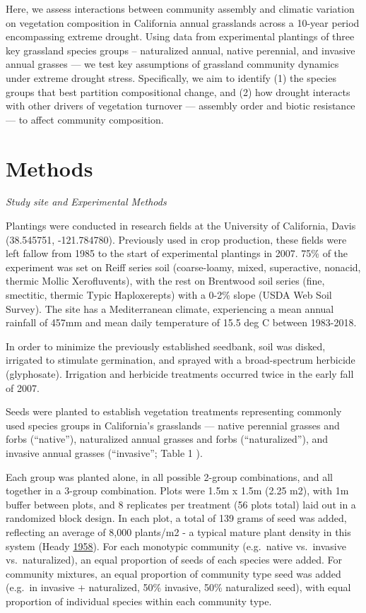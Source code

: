\documentclass[twoside,12pt,final]{ucthesis-CA2012}
\begin{document}
\begin{ucmainmatter}
Here, we assess interactions between community assembly and climatic variation on vegetation composition in California annual grasslands across a 10-year period encompassing extreme drought.
Using data from experimental plantings of three key grassland species groups -- naturalized annual, native perennial, and invasive annual grasses --- we test key assumptions of grassland community dynamics under extreme drought stress.
Specifically, we aim to identify (1) the species groups that best partition compositional change, and (2) how drought interacts with other drivers of vegetation turnover --- assembly order and biotic resistance --- to affect community composition.

\hypertarget{methods}{%
\section{Methods}\label{methods}}

\emph{Study site and Experimental Methods}

Plantings were conducted in research fields at the University of California, Davis (38.545751, -121.784780).
Previously used in crop production, these fields were left fallow from 1985 to the start of experimental plantings in 2007.
75\% of the experiment was set on Reiff series soil (coarse-loamy, mixed, superactive, nonacid, thermic Mollic Xerofluvents), with the rest on Brentwood soil series (fine, smectitic, thermic Typic Haploxerepts) with a 0-2\% slope (USDA Web Soil Survey).
The site has a Mediterranean climate, experiencing a mean annual rainfall of 457mm and mean daily temperature of 15.5 deg C between 1983-2018.

In order to minimize the previously established seedbank, soil was disked, irrigated to stimulate germination, and sprayed with a broad-spectrum herbicide (glyphosate). Irrigation and herbicide treatments occurred twice in the early fall of 2007.

Seeds were planted to establish vegetation treatments representing commonly used species groups in California's grasslands --- native perennial grasses and forbs (``native''), naturalized annual grasses and forbs (``naturalized''), and invasive annual grasses (``invasive''; Table 1 ).

Each group was planted alone, in all possible 2-group combinations, and all together in a 3-group combination.
Plots were 1.5m x 1.5m (2.25 m2), with 1m buffer between plots, and 8 replicates per treatment (56 plots total) laid out in a randomized block design.
In each plot, a total of 139 grams of seed was added, reflecting an average of 8,000 plants/m2 - a typical mature plant density in this system (Heady \protect\hyperlink{ref-Heady1958}{1958}).
For each monotypic community (e.g.~native vs.~invasive vs.~naturalized), an equal proportion of seeds of each species were added. For community mixtures, an equal proportion of community type seed was added (e.g.~in invasive + naturalized, 50\% invasive, 50\% naturalized seed), with equal proportion of individual species within each community type.


\end{ucmainmatter}
\end{document}
